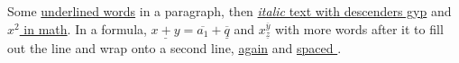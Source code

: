 \documentclass{article}
\begin{document}
Some \underline{underlined words} in a paragraph, then \underline{\textit{italic} text with descenders gyp}
and \underline{$x^2$ in math}. In a formula, $\underline{x+y} = \overline{a_1} + \overline{\underline{q}}$
and $x^{\overline{y}}_{\underline{z}}$ with more words after it to fill out the line and wrap onto a
second line, \underline{again} and \underline{ spaced }.
\end{document}
